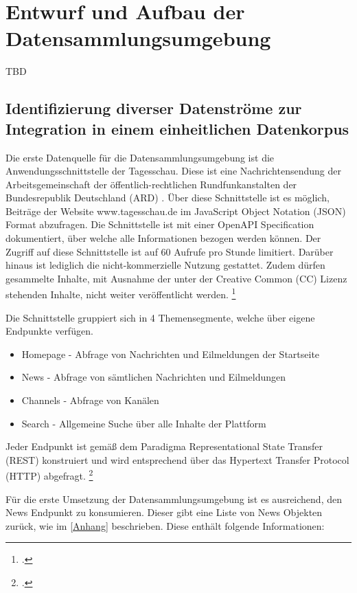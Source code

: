 \newpage
\section{Entwurf und Aufbau der Datensammlungsumgebung}
TBD

\subsection{Identifizierung diverser Datenströme zur Integration in einem einheitlichen Datenkorpus}
Die erste Datenquelle für die Datensammlungsumgebung ist die Anwendungsschnittstelle der Tagesschau. Diese ist eine Nachrichtensendung der Arbeitsgemeinschaft der öffentlich-rechtlichen Rundfunkanstalten der Bundesrepublik Deutschland (ARD) . Über diese Schnittstelle ist es möglich, Beiträge der Website www.tagesschau.de im JavaScript Object Notation (JSON) Format abzufragen. 
Die Schnittstelle ist mit einer OpenAPI Specification dokumentiert, über welche alle Informationen bezogen werden können. Der Zugriff auf diese Schnittstelle ist auf 60 Aufrufe pro Stunde limitiert. Darüber hinaus ist lediglich die nicht-kommerzielle Nutzung gestattet. Zudem dürfen gesammelte Inhalte, mit Ausnahme der unter der Creative Common (CC) Lizenz stehenden Inhalte, nicht weiter veröffentlicht werden. \footcite [Vgl.][]{Fischer.2024}

Die Schnittstelle gruppiert sich in 4 Themensegmente, welche über eigene Endpunkte verfügen. 
\begin{itemize}
    \item Homepage - Abfrage von Nachrichten und Eilmeldungen der Startseite
    \item News - Abfrage von sämtlichen Nachrichten und Eilmeldungen
    \item Channels - Abfrage von Kanälen
    \item Search - Allgemeine Suche über alle Inhalte der Plattform
\end{itemize}
Jeder Endpunkt ist gemäß dem Paradigma Representational State Transfer (REST) konstruiert und wird entsprechend über das Hypertext Transfer Protocol (HTTP) abgefragt. \footcite [Vgl.][]{Fischer.2024}

Für die erste Umsetzung der Datensammlungsumgebung ist es ausreichend, den News Endpunkt zu konsumieren. Dieser gibt eine Liste von News Objekten zurück, wie im \ref{Anhang} beschrieben. Diese enthält folgende Informationen:

